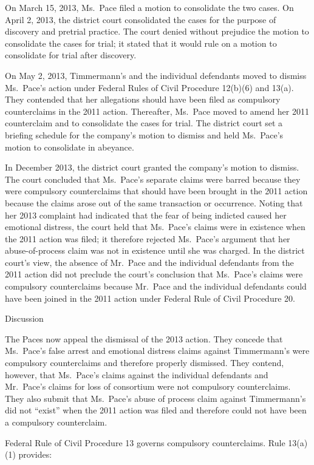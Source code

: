 \documentclass[11pt,letterpaper,twoside]{article}
\begin{document}
On March 15, 2013, Ms.~Pace filed a motion to consolidate the two cases.
On April 2, 2013, the district court consolidated the cases for the
purpose of discovery and pretrial practice. The court denied without
prejudice the motion to consolidate the cases for trial; it stated that
it would rule on a motion to consolidate for trial after discovery.

On May 2, 2013, Timmermann's and the individual defendants moved to
dismiss Ms.~Pace's action under Federal Rules of Civil Procedure
12(b)(6) and 13(a). They contended that her allegations should have been
filed as compulsory counterclaims in the 2011 action. Thereafter,
Ms.~Pace moved to amend her 2011 counterclaim and to consolidate the
cases for trial. The district court set a briefing schedule for the
company's motion to dismiss and held Ms.~Pace's motion to consolidate in
abeyance.

In December 2013, the district court granted the company's motion to
dismiss. The court concluded that Ms.~Pace's separate claims were barred
because they were compulsory counterclaims that should have been brought
in the 2011 action because the claims arose out of the same transaction
or occurrence. Noting that her 2013 complaint had indicated that the
fear of being indicted caused her emotional distress, the court held
that Ms.~Pace's claims were in existence when the 2011 action was filed;
it therefore rejected Ms.~Pace's argument that her abuse-of-process
claim was not in existence until she was charged. In the district
court's view, the absence of Mr.~Pace and the individual defendants from
the 2011 action did not preclude the court's conclusion that Ms.~Pace's
claims were compulsory counterclaims because Mr.~Pace and the individual
defendants could have been joined in the 2011 action under Federal Rule
of Civil Procedure 20.

{Discussion}

The Paces now appeal the dismissal of the 2013 action. They concede that
Ms.~Pace's false arrest and emotional distress claims against
Timmermann's were compulsory counterclaims and therefore properly
dismissed. They contend, however, that Ms.~Pace's claims against the
individual defendants and Mr.~Pace's claims for loss of consortium were
not compulsory counterclaims. They also submit that Ms.~Pace's abuse of
process claim against Timmermann's did not ``exist'' when the 2011
action was filed and therefore could not have been a compulsory
counterclaim.

Federal Rule of Civil Procedure 13 governs compulsory counterclaims.
Rule 13(a)(1) provides:
\end{document}
